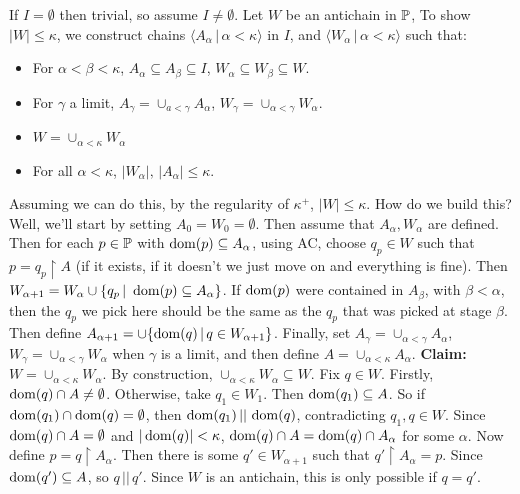 \documentclass{article}
\begin{document}
    \proof If $I = \emptyset$ then trivial, so assume $I \neq \emptyset$. Let $W$ be an antichain in $\mathbb{P}$, To show $|W| \leq \kappa$, we construct chains $\langle A_{\alpha} \, | \, \alpha < \kappa\rangle$ in $I$, and $\langle W_{\alpha} \, | \, \alpha < \kappa \rangle$ such that: \begin{itemize}
        \item[(i)] For $\alpha < \beta < \kappa$, $A_{\alpha} \subseteq A_{\beta} \subseteq I$, $W_{\alpha} \subseteq W_{\beta} \subseteq W$.
        \item[(ii)] For $\gamma$ a limit, $A_{\gamma} = \cup_{a < \gamma} A_{\alpha}$, $W_{\gamma} = \cup_{\alpha < \gamma} W_{\alpha}$.
        \item[(iii)] $W = \cup_{\alpha < \kappa} W_{\alpha}$
        \item[(iv)] For all $\alpha < \kappa$, $|W_{\alpha}|, \, |A_{\alpha}| \leq \kappa$.
    \end{itemize}
    Assuming we can do this, by the regularity of $\kappa^{+}$, $|W| \leq \kappa$. \gap
    How do we build this? Well, we'll start by setting $A_{0} = W_{0} = \emptyset$. Then assume that $A_{\alpha}, W_{\alpha}$ are defined. Then for each $p \in \mathbb{P}$ with $\operatorname{dom}(p) \subseteq A_{\alpha}$, using AC, choose $q_{p} \in W$ such that $p = q_{p} \upharpoonright A$ (if it exists, if it doesn't we just move on and everything is fine). \gap
    Then $W_{\alpha+1} = W_{\alpha} \cup \{ q_{p} \, | \ \operatorname{dom}(p) \subseteq A_{\alpha}\}$. If $\operatorname{dom}(p)$ were contained in $A_{\beta}$, with $\beta < \alpha$, then the $q_{p}$ we pick here should be the same as the $q_{p}$ that was picked at stage $\beta$. \gap Then define $A_{\alpha+1} = \cup \{ \operatorname{dom}(q) \, | \, q \in W_{\alpha+1}\}$. \gap Finally, set $A_{\gamma} = \cup_{\alpha< \gamma} A_{\alpha}$, $W_{\gamma} = \cup_{\alpha< \gamma} W_{\alpha}$ when $\gamma$ is a limit, and then define $A = \cup_{\alpha < \kappa} A_{\alpha}$.\gap
    \textbf{Claim:} $W = \cup_{\alpha < \kappa} W_{\alpha}$. \gap
    By construction, $\cup_{\alpha < \kappa} W_{\alpha} \subseteq W$. Fix $q \in W$. Firstly, $\operatorname{dom}(q) \cap A \neq \emptyset$. Otherwise, take $q_{1} \in W_{1}$. Then $\operatorname{dom}(q_{1}) \subseteq A$. So if $\operatorname{dom}(q_{1}) \cap \operatorname{dom}(q) = \emptyset$, then $\operatorname{dom}(q_{1}) \, || \, \operatorname{dom}(q)$, contradicting $q_{1}, q \in W$. \gap
    Since $\operatorname{dom}(q) \cap A = \emptyset$ and $|\operatorname{dom}(q)| < \kappa$, $\operatorname{dom}(q) \cap A = \operatorname{dom}(q) \cap A_{\alpha}$ for some $\alpha$. \gap
    Now define $p = q \upharpoonright A_{\alpha}$. Then there is some $q' \in W_{\alpha+1}$ such that $q' \upharpoonright A_{\alpha}=p$. Since $\operatorname{dom}(q') \subseteq A$, so $q \, || \, q'$. Since $W$ is an antichain, this is only possible if $q = q'$.\gap
\end{document}
